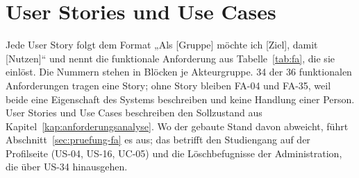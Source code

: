 
\chapter{User Stories und Use Cases}
\label{anh:user-stories}

Jede User Story folgt dem Format „Als [Gruppe] möchte ich [Ziel], damit [Nutzen]“ und nennt die funktionale Anforderung aus Tabelle~\ref{tab:fa}, die sie einlöst. Die Nummern stehen in Blöcken je Akteurgruppe. 34 der 36 funktionalen Anforderungen tragen eine Story; ohne Story bleiben FA-04 und FA-35, weil beide eine Eigenschaft des Systems beschreiben und keine Handlung einer Person. User Stories und Use Cases beschreiben den Sollzustand aus Kapitel~\ref{kap:anforderungsanalyse}. Wo der gebaute Stand davon abweicht, führt Abschnitt~\ref{sec:pruefung-fa} es aus; das betrifft den Studiengang auf der Profilseite (US-04, US-16, UC-05) und die Löschbefugnisse der Administration, die über US-34 hinausgehen.

\newcommand{\usTabelle}[3]{%
\begingroup
\footnotesize
\setlength{\tabcolsep}{4pt}
\renewcommand{\arraystretch}{1.08}
\setlength{\LTcapwidth}{\textwidth}
\begin{longtable}{@{}L{1.0cm}L{11.3cm}L{2.2cm}@{}}
	\caption[#1]{#1 (eigene Darstellung)}
	\label{#2}\\
	\toprule
	\textbf{ID} & \textbf{User Story} & \textbf{Bezug} \\
	\midrule
	\endfirsthead
	\toprule
	\textbf{ID} & \textbf{User Story} & \textbf{Bezug} \\
	\midrule
	\endhead
	\bottomrule
	\endfoot
	#3
\end{longtable}
\endgroup}

